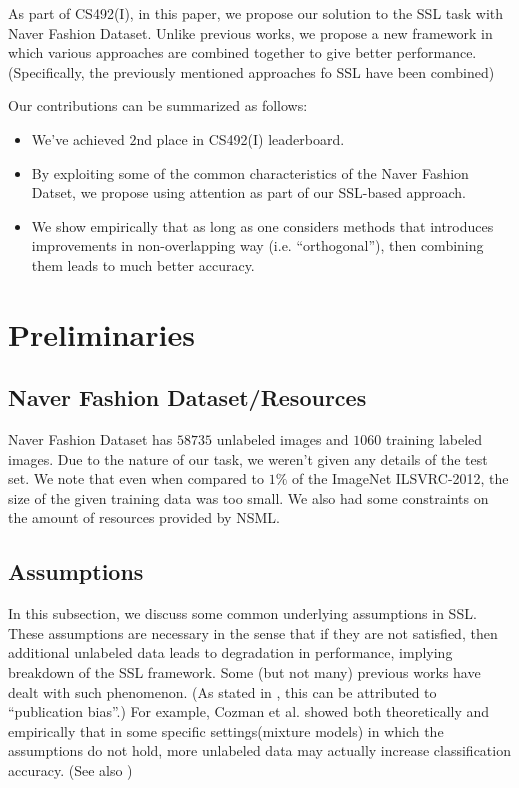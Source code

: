 \documentclass[10pt,twocolumn,letterpaper]{article}
\begin{document}
	As part of CS492(I), in this paper, we propose our solution to the SSL task with Naver Fashion Dataset.
	Unlike previous works, we propose a new framework in which various approaches are combined together to give better performance.
	(Specifically, the previously mentioned approaches fo SSL have been combined)
	
	Our contributions can be summarized as follows:
	\begin{itemize}
		\item We've achieved $2$nd place in CS492(I) leaderboard.
		
		\item By exploiting some of the common characteristics of the Naver Fashion Datset, we propose using attention as part of our SSL-based approach.
		
		\item We show empirically that as long as one considers methods that introduces improvements in non-overlapping way (i.e. \enquote{orthogonal}), then combining them leads to much better accuracy.
	\end{itemize}
	
	
	
	\section{Preliminaries}
	
	\subsection{Naver Fashion Dataset/Resources}
	Naver Fashion Dataset has $58735$ unlabeled images and $1060$ training labeled images.
	Due to the nature of our task, we weren't given any details of the test set.
	We note that even when compared to $1\%$ of the ImageNet ILSVRC-2012\cite{ILSVRC15}, the size of the given training data was too small.
	We also had some constraints on the amount of resources provided by NSML\cite{NSML}.
	
	
	\subsection{Assumptions}
	In this subsection, we discuss some common underlying assumptions in SSL.
	These assumptions are necessary in the sense that if they are not satisfied, then additional unlabeled data leads to degradation in performance, implying breakdown of the SSL framework.
	Some (but not many) previous works have dealt with such phenomenon. (As stated in \cite{Zhu05}, this can be attributed to \enquote{publication bias}.)
	For example, Cozman et al.\cite{CCC02} showed both theoretically and empirically that in some specific settings(mixture models) in which the assumptions do not hold, more unlabeled data may actually increase classification accuracy.
	(See also \cite{Elworthy94})
	
\end{document}
